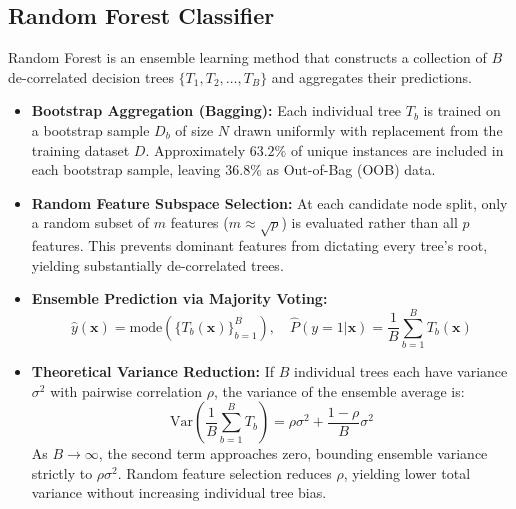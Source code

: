 \documentclass[12pt,a4paper]{article}
\begin{document}
\subsection{Random Forest Classifier}
Random Forest is an ensemble learning method that constructs a collection of $B$ de-correlated decision trees $\{T_1, T_2, \dots, T_B\}$ and aggregates their predictions.
\begin{itemize}
\item \textbf{Bootstrap Aggregation (Bagging):} Each individual tree $T_b$ is trained on a bootstrap sample $D_b$ of size $N$ drawn uniformly with replacement from the training dataset $D$. Approximately $63.2\%$ of unique instances are included in each bootstrap sample, leaving $36.8\%$ as Out-of-Bag (OOB) data.
\item \textbf{Random Feature Subspace Selection:} At each candidate node split, only a random subset of $m$ features ($m \approx \sqrt{p}$) is evaluated rather than all $p$ features. This prevents dominant features from dictating every tree's root, yielding substantially de-correlated trees.
\item \textbf{Ensemble Prediction via Majority Voting:}
\begin{equation}
\hat{y}(\mathbf{x}) = \text{mode} \left( \{ T_b(\mathbf{x}) \}_{b=1}^B \right), \quad \hat{P}(y=1|\mathbf{x}) = \frac{1}{B} \sum_{b=1}^B T_b(\mathbf{x})
\end{equation}
\item \textbf{Theoretical Variance Reduction:} If $B$ individual trees each have variance $\sigma^2$ with pairwise correlation $\rho$, the variance of the ensemble average is:
\begin{equation}
\text{Var}\left(\frac{1}{B}\sum_{b=1}^B T_b\right) = \rho \sigma^2 + \frac{1-\rho}{B}\sigma^2
\end{equation}
As $B \to \infty$, the second term approaches zero, bounding ensemble variance strictly to $\rho \sigma^2$. Random feature selection reduces $\rho$, yielding lower total variance without increasing individual tree bias.
\end{itemize}
\end{document}
